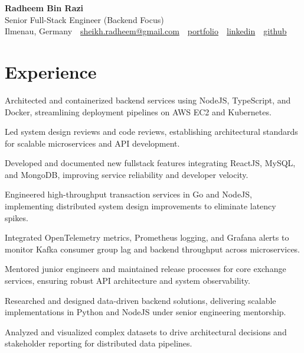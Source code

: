 \documentclass[10pt,a4paper]{resume}
\makeatletter
\newcommand{\Portfolio}{https://radheem.github.io/my-cv}
\newcommand{\PortfolioText}{portfolio}
\newcommand{\GitHub}{https://github.com/radheem}
\newcommand{\LinkedIn}{https://www.linkedin.com/in/radheem-razi}
\newcommand{\Email}{sheikh.radheem@gmail.com}
\makeatother
\begin{document}
\begin{center}
  {\huge\bfseries Radheem Bin Razi}\\[3pt]
  {\large Senior Full-Stack Engineer (Backend Focus)}\\[6pt]
  \small
  Ilmenau, Germany \,\textbar\,
  \href{mailto:\Email}{\Email} \,\textbar\,
  \href{\Portfolio}{\PortfolioText} \,\textbar\,
  \href{\LinkedIn}{linkedin} \,\textbar\,
  \href{\GitHub}{github}
\end{center}
\vspace{2pt}

\section{Experience}

\bullets
  \item Architected and containerized backend services using NodeJS, TypeScript, and Docker, streamlining deployment pipelines on AWS EC2 and Kubernetes.
  \item Led system design reviews and code reviews, establishing architectural standards for scalable microservices and API development.
  \item Developed and documented new fullstack features integrating ReactJS, MySQL, and MongoDB, improving service reliability and developer velocity.
\bulletsend
\vspace{1.5pt}
\bullets
  \item Engineered high-throughput transaction services in Go and NodeJS, implementing distributed system design improvements to eliminate latency spikes.
  \item Integrated OpenTelemetry metrics, Prometheus logging, and Grafana alerts to monitor Kafka consumer group lag and backend throughput across microservices.
  \item Mentored junior engineers and maintained release processes for core exchange services, ensuring robust API architecture and system observability.
\bulletsend
\vspace{1.5pt}
\bullets
  \item Researched and designed data-driven backend solutions, delivering scalable implementations in Python and NodeJS under senior engineering mentorship.
  \item Analyzed and visualized complex datasets to drive architectural decisions and stakeholder reporting for distributed data pipelines.
\bulletsend
\vspace{1.5pt}
\end{document}
